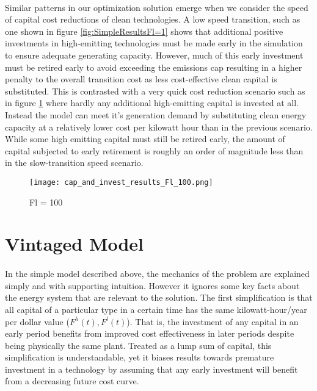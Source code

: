 \documentclass{easychithesis}
\begin{document}
\paragraph{} Similar patterns in our optimization solution emerge when we consider the speed of capital cost reductions of clean technologies. A low speed transition, such as one shown in figure \ref{fig:SimpleResultsFl=1} shows that additional positive investments in high-emitting technologies must be made early in the simulation to ensure adequate generating capacity. However, much of this early investment must be retired early to avoid exceeding the emissions cap resulting in a higher penalty to the overall transition cost as less cost-effective clean capital is substituted. This is contrasted with a very quick cost reduction scenario such as in figure \ref{fig:SimpleResultsFl=100} where hardly any additional high-emitting capital is invested at all. Instead the model can meet it's generation demand by substituting clean energy capacity at a relatively lower cost per kilowatt hour than in the previous scenario. While some high emitting capital must still be retired early, the amount of capital subjected to early retirement is roughly an order of magnitude less than in the slow-transition speed scenario. 

\begin{figure}[h]
\texttt{[image: cap\_and\_invest\_results\_Fl\_100.png]}
\caption{Fl = 100\label{fig:SimpleResultsFl=100}}
\end{figure}



\FloatBarrier

\section{Vintaged Model}\label{VintExplan}

\paragraph{} In the simple model described above, the mechanics of the problem are explained simply and with supporting intuition. However it ignores some key facts about the energy system that are relevant to the solution. The first simplification is that all capital of a particular type in a certain time has the same kilowatt-hour/year per dollar value ($F^h(t), F^l(t)$). That is, the investment of any capital in an early period benefits from improved cost effectiveness in later periods despite being physically the same plant. Treated as a lump sum of capital, this simplification is understandable, yet it biases results towards premature investment in a technology by assuming that any early investment will benefit from a decreasing future cost curve. 
\end{document}
